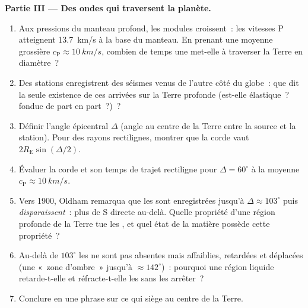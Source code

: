 \begin{problem}
\medskip\noindent\textbf{Partie III --- Des ondes qui traversent la planète.}
\begin{enumerate}[resume]
  \item Aux pressions du manteau profond, les modules croissent~: les
        vitesses P atteignent \qty{13.7}{km/s} à la base du manteau.
        En prenant une moyenne grossière $c_{\text{P}} \approx \qty{10}{km/s}$, combien de temps
        une  met-elle à traverser la Terre en diamètre~?
  \item Des stations enregistrent des séismes venus de l'autre côté du
        globe~: que dit la seule existence de ces arrivées sur la Terre
        profonde (est-elle élastique~? fondue de part en part~?)~?
  \item Définir l'angle épicentral $\Delta$ (angle au centre de la
        Terre entre la source et la station). Pour des rayons
        rectilignes, montrer que la corde vaut
        $2R_{\text{E}}\sin(\Delta/2)$.
  \item Évaluer la corde et son temps de trajet rectiligne pour
        $\Delta = 60^\circ$ à la moyenne $c_{\text{P}} \approx
        \qty{10}{km/s}$.
  \item Vers 1900, Oldham remarqua que les  sont enregistrées
        jusqu'à $\Delta \approx 103^\circ$ puis \emph{disparaissent}~:
        plus de S directe au-delà. Quelle propriété d'une région
        profonde de la Terre tue les , et quel état de la
        matière possède cette propriété~?
  \item Au-delà de $103^\circ$ les  ne sont pas absentes mais
        affaiblies, retardées et déplacées (une «~zone d'ombre~»
        jusqu'à $\approx 142^\circ$)~: pourquoi une région liquide
        retarde-t-elle et réfracte-t-elle les  sans les
        arrêter~?
  \item Conclure en une phrase sur ce qui siège au centre de la Terre.
\end{enumerate}


\end{problem}
